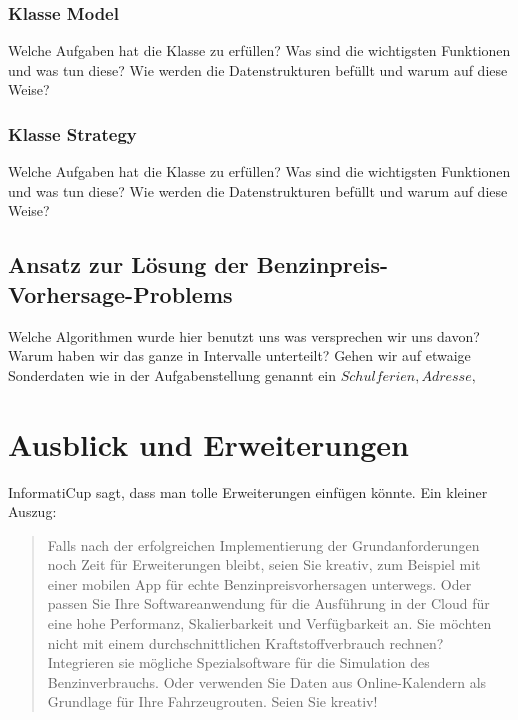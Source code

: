 \documentclass[11pt]{article}
\begin{document}
\subsubsection{Klasse Model}
	Welche Aufgaben hat die Klasse zu erfüllen? Was sind die wichtigsten Funktionen und was tun diese? Wie werden die Datenstrukturen befüllt und warum auf diese Weise?
\subsubsection{Klasse Strategy}
	Welche Aufgaben hat die Klasse zu erfüllen? Was sind die wichtigsten Funktionen und was tun diese? Wie werden die Datenstrukturen befüllt und warum auf diese Weise?
\subsection{Ansatz zur Lösung der Benzinpreis-Vorhersage-Problems}
	Welche Algorithmen wurde hier benutzt uns was versprechen wir uns davon? Warum haben wir das ganze in Intervalle unterteilt? Gehen wir auf etwaige Sonderdaten wie in der Aufgabenstellung genannt ein \(Schulferien, Adresse,\)
\section{Ausblick und Erweiterungen}
	InformatiCup sagt, dass man tolle Erweiterungen einfügen könnte. Ein kleiner Auszug: 
	\begin{quote}
		Falls nach der erfolgreichen Implementierung der Grundanforderungen noch Zeit für Erweiterungen bleibt, seien Sie kreativ, zum Beispiel mit einer mobilen App für echte Benzinpreisvorhersagen unterwegs. Oder passen Sie Ihre Softwareanwendung für die Ausführung in der Cloud für eine hohe Performanz, Skalierbarkeit und Verfügbarkeit an. Sie möchten nicht mit einem durchschnittlichen Kraftstoffverbrauch rechnen? Integrieren sie mögliche Spezialsoftware für die Simulation des Benzinverbrauchs. Oder verwenden Sie Daten aus Online-Kalendern als Grundlage für Ihre Fahrzeugrouten. Seien Sie kreativ!
	\end{quote}
	
\end{document}
